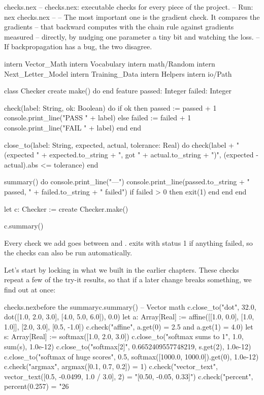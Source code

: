 \documentclass[11pt,a4paper,oneside,openany]{book}
\newcommand{\code}[1]{\texttt{\detokenize{#1}}}
\begin{document}
\begin{newfile}{checks.nex}
-- checks.nex: executable checks for every piece of the project.
-- Run: nex checks.nex
--
-- The most important one is the gradient check. It compares the gradients
-- that backward computes with the chain rule against gradients measured
-- directly, by nudging one parameter a tiny bit and watching the loss.
-- If backpropagation has a bug, the two disagree.

intern Vector_Math
intern Vocabulary
intern math/Random
intern Next_Letter_Model
intern Training_Data
intern Helpers
intern io/Path

class Checker
create
  make() do
  end
feature
  passed: Integer
  failed: Integer

  check(label: String, ok: Boolean) do
    if ok then
      passed := passed + 1
      console.print_line("PASS " + label)
    else
      failed := failed + 1
      console.print_line("FAIL " + label)
    end
  end

  close_to(label: String, expected, actual, tolerance: Real) do
    check(label + " (expected " + expected.to_string
      + ", got " + actual.to_string + ")",
      (expected - actual).abs <= tolerance)
  end

  summary() do
    console.print_line("---")
    console.print_line(passed.to_string + " passed, " + failed.to_string + " failed")
    if failed > 0 then
      exit(1)
    end
  end
end

let c: Checker := create Checker.make()

c.summary()
\end{newfile}

Every check we add goes between \code{let c} and \code{c.summary()}.
\code{summary} exits with status 1 if anything failed, so the checks can
also be run automatically.

Let's start by locking in what we built in the earlier chapters. These
checks repeat a few of the try-it results, so that if a later change
breaks something, we find out at once:

\begin{addbefore}{checks.nex}{before the summary}{c.summary()}
-- Vector math
c.close_to("dot", 32.0, dot([1.0, 2.0, 3.0], [4.0, 5.0, 6.0]), 0.0)
let a: Array[Real] := affine([[1.0, 0.0], [1.0, 1.0]], [2.0, 3.0], [0.5, -1.0])
c.check("affine", a.get(0) = 2.5 and a.get(1) = 4.0)
let s: Array[Real] := softmax([1.0, 2.0, 3.0])
c.close_to("softmax sums to 1", 1.0, sum(s), 1.0e-12)
c.close_to("softmax[2]", 0.6652409557748219, s.get(2), 1.0e-12)
c.close_to("softmax of huge scores", 0.5, softmax([1000.0, 1000.0]).get(0), 1.0e-12)
c.check("argmax", argmax([0.1, 0.7, 0.2]) = 1)
c.check("vector_text", vector_text([0.5, -0.0499, 1.0 / 3.0], 2) = "[0.50, -0.05, 0.33]")
c.check("percent", percent(0.257) = "26%
\end{addbefore}
\end{document}
